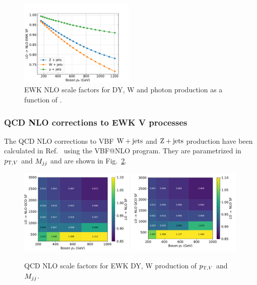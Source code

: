 \begin{figure}[ht!]
    \begin{center}
        \includegraphics[width=0.49\textwidth]{ScaleFactors/NLO/nlo_ewk.pdf}
        \caption{
            EWK NLO scale factors for DY, W and photon production as a function of \ptv.
          }
      \label{fig:theory_sf_ew_nlo}
    \end{center}
\end{figure}

\subsubsection{QCD NLO corrections to EWK V processes}

The QCD NLO corrections to VBF $\mathrm{W}+\textrm{jets}$ and $\mathrm{Z}+\textrm{jets}$ production have been calculated in Ref.~\cite{AN-2017-267} using the VBF@NLO program. 
They are parametrized in $p_{\mathrm{T},V}$ and $M_{jj}$ and are shown in Fig.~\ref{fig:theory_sf_qcd_nlo_for_ewk}.

\begin{figure}[ht!]
    \begin{center}
        \includegraphics[width=0.49\textwidth]{ScaleFactors/NLO/nlo_qcd_for_ewk_dy.pdf}
        \includegraphics[width=0.49\textwidth]{ScaleFactors/NLO/nlo_qcd_for_ewk_w.pdf}
        \caption{
            QCD NLO scale factors for EWK DY, W production of $p_{\mathrm{T},V}$ and $M_{jj}$.
          }
      \label{fig:theory_sf_qcd_nlo_for_ewk}
    \end{center}
\end{figure}

